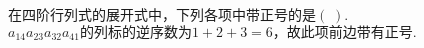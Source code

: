 $\mathrm{在四阶行列式的展开式中}，\mathrm{下列各项中带正号的是}(\;).$
$a_{14}a_{23}a_{32}a_{41}\mathrm{的列标的逆序数为}1+2+3=6，\mathrm{故此项前边带有正号}.$

